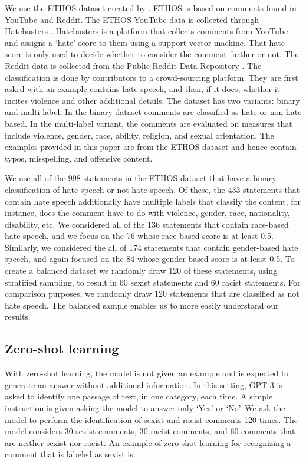 \documentclass{bmcart}
\begin{document}
We use the ETHOS dataset created by \cite{mollas2020ethos}. ETHOS is based on comments found in YouTube and Reddit. The ETHOS YouTube data is collected through Hatebusters \cite{anagnostou2018hatebusters}. Hatebusters is a platform that collects comments from YouTube and assigns a `hate' score to them using a support vector machine. That hate-score is only used to decide whether to consider the comment further or not. The Reddit data is collected from the Public Reddit Data Repository \cite{baumgartner2020pushshift}. The classification is done by contributors to a crowd-sourcing platform. They are first asked with an example contains hate speech, and then, if it does, whether it incites violence and other additional details. The dataset has two variants: binary and multi-label. In the binary dataset comments are classified as hate or non-hate based. In the multi-label variant, the comments are evaluated on measures that include violence, gender, race, ability, religion, and sexual orientation. The examples provided in this paper are from the ETHOS dataset and hence contain typos, misspelling, and offensive content.

We use all of the 998 statements in the ETHOS dataset that have a binary classification of hate speech or not hate speech. Of these, the 433 statements that contain hate speech additionally have multiple labels that classify the content, for instance, does the comment have to do with violence, gender, race, nationality, disability, etc. We considered all of the 136 statements that contain race-based hate speech, and we focus on the 76 whose race-based score is at least 0.5. Similarly, we considered the all of 174 statements that contain gender-based hate speech, and again focused on the 84 whose gender-based score is at least 0.5. To create a balanced dataset we randomly draw 120 of these statements, using stratified sampling, to result in 60 sexist statements and 60 racist statements. For comparison purposes, we randomly draw 120 statements that are classified as not hate speech. The balanced sample enables us to more easily understand our results.

\subsection{Zero-shot learning}\label{zero-shot-learning}

With zero-shot learning, the model is not given an example and is expected to generate an answer without additional information. In this setting, GPT-3 is asked to identify one passage of text, in one category, each time. A simple instruction is given asking the model to answer only `Yes' or `No'. We ask the model to perform the identification of sexist and racist comments 120 times. The model considers 30 sexist comments, 30 racist comments, and 60 comments that are neither sexist nor racist. An example of zero-shot learning for recognizing a comment that is labeled as sexist is:
\end{document}
